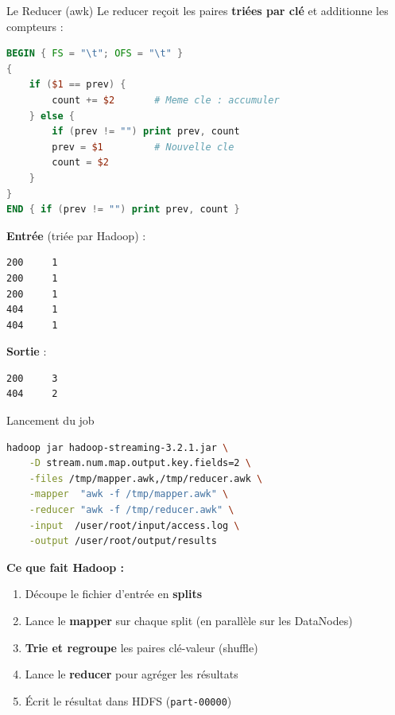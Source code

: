 \documentclass[aspectratio=169, 11pt]{beamer}
\begin{document}
\begin{frame}[fragile]{Le Reducer (awk)}
  Le reducer reçoit les paires \textbf{triées par clé} et additionne les compteurs :

  \begin{lstlisting}[language=awk]
BEGIN { FS = "\t"; OFS = "\t" }
{
    if ($1 == prev) {
        count += $2       # Meme cle : accumuler
    } else {
        if (prev != "") print prev, count
        prev = $1         # Nouvelle cle
        count = $2
    }
}
END { if (prev != "") print prev, count }
  \end{lstlisting}

  \vspace{0.3em}
  \textbf{Entrée} (triée par Hadoop) :
  \begin{lstlisting}[basicstyle=\ttfamily\small]
200     1
200     1
200     1
404     1
404     1
  \end{lstlisting}

  \textbf{Sortie} :
  \begin{lstlisting}[basicstyle=\ttfamily\small]
200     3
404     2
  \end{lstlisting}
\end{frame}

\begin{frame}[fragile]{Lancement du job}
  \begin{lstlisting}[language=bash, basicstyle=\ttfamily\scriptsize]
hadoop jar hadoop-streaming-3.2.1.jar \
    -D stream.num.map.output.key.fields=2 \
    -files /tmp/mapper.awk,/tmp/reducer.awk \
    -mapper  "awk -f /tmp/mapper.awk" \
    -reducer "awk -f /tmp/reducer.awk" \
    -input  /user/root/input/access.log \
    -output /user/root/output/results
  \end{lstlisting}

  \vspace{0.5em}
  \textbf{Ce que fait Hadoop :}
  \begin{enumerate}
    \item Découpe le fichier d'entrée en \textbf{splits}
    \item Lance le \textbf{mapper} sur chaque split (en parallèle sur les DataNodes)
    \item \textbf{Trie et regroupe} les paires clé-valeur (shuffle)
    \item Lance le \textbf{reducer} pour agréger les résultats
    \item Écrit le résultat dans HDFS (\texttt{part-00000})
  \end{enumerate}
\end{frame}
\end{document}

